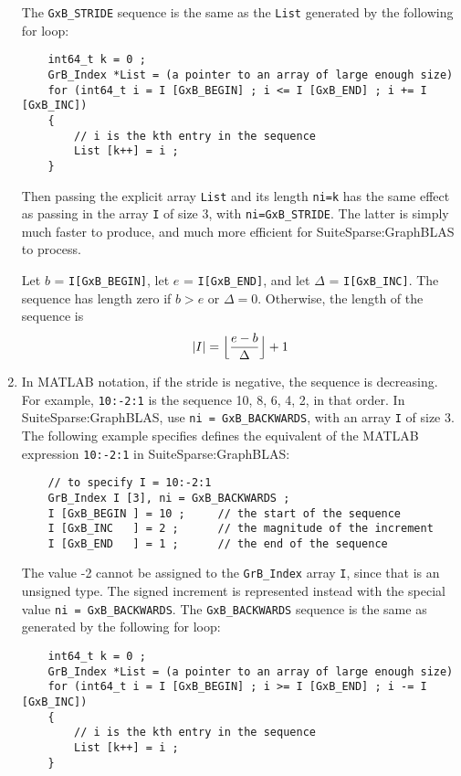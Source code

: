 \documentclass[12pt]{article}
\begin{document}
\begin{enumerate}
    The \verb'GxB_STRIDE' sequence is the same as the \verb'List' generated by
    the following for loop:

    {\footnotesize
    \begin{verbatim}
    int64_t k = 0 ;
    GrB_Index *List = (a pointer to an array of large enough size)
    for (int64_t i = I [GxB_BEGIN] ; i <= I [GxB_END] ; i += I [GxB_INC])
    {
        // i is the kth entry in the sequence
        List [k++] = i ;
    } \end{verbatim}}

    Then passing the explicit array \verb'List' and its length \verb'ni=k' has
    the same effect as passing in the array \verb'I' of size 3, with
    \verb'ni=GxB_STRIDE'.  The latter is simply much faster to produce, and
    much more efficient for SuiteSparse:GraphBLAS to process.

    Let $b$ = \verb'I[GxB_BEGIN]', let $e$ = \verb'I[GxB_END]', and let
    $\Delta$ = \verb'I[GxB_INC]'.  The sequence has length zero if $b > e$ or
    $\Delta=0$.  Otherwise, the length of the sequence is
    \[
    |I| = \Bigl\lfloor\dfrac{e-b}{\Delta}\Bigr\rfloor + 1
    \]

\item
    In MATLAB notation, if the stride is negative, the sequence is decreasing.
    For example, \verb'10:-2:1' is the sequence 10, 8, 6, 4, 2, in that order.
    In SuiteSparse:GraphBLAS, use \verb'ni = GxB_BACKWARDS', with an array
    \verb'I' of size 3.  The following example specifies defines the equivalent
    of the MATLAB expression \verb'10:-2:1' in SuiteSparse:GraphBLAS:

    \vspace{-0.1in}
    {\footnotesize
    \begin{verbatim}
    // to specify I = 10:-2:1
    GrB_Index I [3], ni = GxB_BACKWARDS ;
    I [GxB_BEGIN ] = 10 ;     // the start of the sequence
    I [GxB_INC   ] = 2 ;      // the magnitude of the increment
    I [GxB_END   ] = 1 ;      // the end of the sequence \end{verbatim}}

    \vspace{-0.1in}
    The value -2 cannot be assigned to the \verb'GrB_Index' array \verb'I',
    since that is an unsigned type.  The signed increment is represented
    instead with the special value \verb'ni = GxB_BACKWARDS'.
    The \verb'GxB_BACKWARDS' sequence is the same as generated by the following
    for loop:

    \vspace{-0.1in}
    {\footnotesize
    \begin{verbatim}
    int64_t k = 0 ;
    GrB_Index *List = (a pointer to an array of large enough size)
    for (int64_t i = I [GxB_BEGIN] ; i >= I [GxB_END] ; i -= I [GxB_INC])
    {
        // i is the kth entry in the sequence
        List [k++] = i ;
    } \end{verbatim}}


\end{enumerate}
\end{document}
